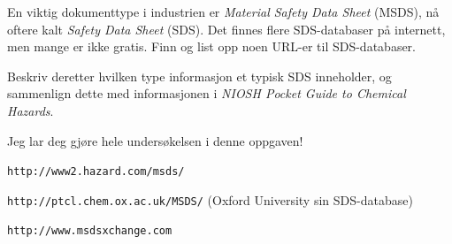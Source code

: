 

En viktig dokumenttype i industrien er {\it Material Safety Data Sheet} (MSDS), nå oftere kalt {\it Safety Data Sheet} (SDS). Det finnes flere SDS-databaser på internett, men mange er ikke gratis. Finn og list opp noen URL-er til SDS-databaser.

\vskip 10pt

Beskriv deretter hvilken type informasjon et typisk SDS inneholder, og sammenlign dette med informasjonen i {\it NIOSH Pocket Guide to Chemical Hazards}.







Jeg lar deg gjøre hele undersøkelsen i denne oppgaven!







{\tt http://www2.hazard.com/msds/}

\vskip 10pt

{\tt http://ptcl.chem.ox.ac.uk/MSDS/} (Oxford University sin SDS-database)

\vskip 10pt

{\tt http://www.msdsxchange.com}



